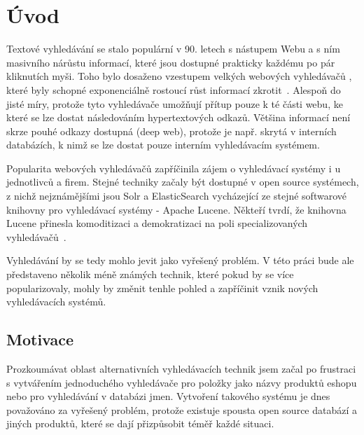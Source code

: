 \documentclass[11pt,letterpaper,oneside,openright]{book}
\begin{document}
\frontmatter
{\hypersetup{hidelinks}
    \tableofcontents
}

\mainmatter
\chapter{Úvod}
Textové vyhledávání se stalo populární v 90. letech s nástupem Webu a s ním
masivního nárůstu informací, které jsou dostupné prakticky každému po pár
kliknutích myši. Toho bylo dosaženo vzestupem velkých webových vyhledávačů ,
které byly schopné exponenciálně rostoucí růst informací
zkrotit~\cite{search_history}. Alespoň do jisté míry, protože tyto vyhledávače
umožňují přítup pouze k té části webu, ke které se lze dostat následováním
hypertextových odkazů. Většina informací není skrze pouhé odkazy dostupná (deep
web), protože je např. skrytá v interních databázích, k nimž se lze dostat
pouze interním vyhledávacím systémem.

Popularita webových vyhledávačů zapříčinila zájem o vyhledávací systémy i u
jednotlivců a firem. Stejné techniky začaly být dostupné v open source
systémech, z nichž nejznámějšími jsou Solr a ElasticSearch vycházející ze
stejné softwarové knihovny pro vyhledávací systémy - Apache Lucene. Někteří
tvrdí, že knihovna Lucene přinesla komoditizaci a demokratizaci na poli
specializovaných vyhledávačů~\cite{dion_almaer,javaworld}.

Vyhledávání by se tedy mohlo jevit jako vyřešený problém. V této práci bude ale
představeno několik méně známých technik, které pokud by se více
popularizovaly, mohly by změnit tenhle pohled a zapříčinit vznik nových
vyhledávacích systémů.



\section{Motivace}
Prozkoumávat oblast alternativních vyhledávacích technik jsem začal po
frustraci s vytvářením jednoduchého vyhledávače pro položky jako názvy produktů
eshopu nebo pro vyhledávání v databázi jmen. Vytvoření takového systému je dnes
považováno za vyřešený problém, protože existuje spousta open source databází a
jiných produktů, které se dají přizpůsobit téměř každé situaci.
\end{document}

